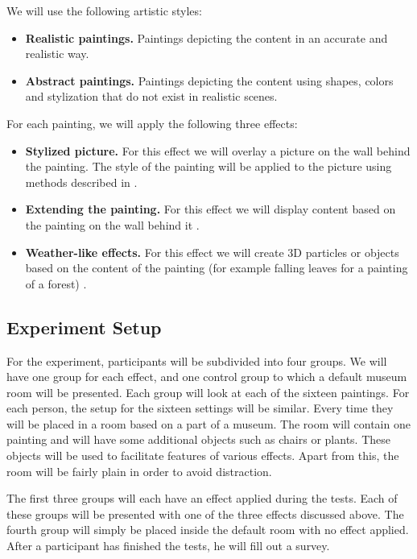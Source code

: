 \documentclass[a4paper]{article}
\begin{document}
We will use the following artistic styles:

\begin{itemize}
\item \textbf{Realistic paintings.} Paintings depicting the content in an accurate and realistic way.
\item \textbf{Abstract paintings.} Paintings depicting the content using shapes, colors and stylization that do not exist in realistic scenes.
\end{itemize}

For each painting, we will apply the following three effects:

\begin{itemize}
\item \textbf{Stylized picture.} For this effect we will overlay a picture on the wall behind the painting. The style of the painting will be applied to the picture using methods described in \cite{gatys}.
\item \textbf{Extending the painting.} For this effect we will display content based on the painting on the wall behind it \cite{inpainting}.
\item \textbf{Weather-like effects.} For this effect we will create 3D particles or objects based on the content of the painting (for example falling leaves for a painting of a forest) \cite{illumiroom}.
\end{itemize}

\subsection{Experiment Setup}

For the experiment, participants will be subdivided into four groups. We will have one group for each effect, and one control group to which a default museum room will be presented. Each group will look at each of the sixteen paintings. For each person, the setup for the sixteen settings will be similar. Every time they will be placed in a room based on a part of a museum. The room will contain one painting and will have some additional objects such as chairs or plants. These objects will be used to facilitate features of various effects. Apart from this, the room will be fairly plain in order to avoid distraction.

The first three groups will each have an effect applied during the tests. Each of these groups will be presented with one of the three effects discussed above. The fourth group will simply be placed inside the default room with no effect applied. After a participant has finished the tests, he will fill out a survey. 
\end{document}
